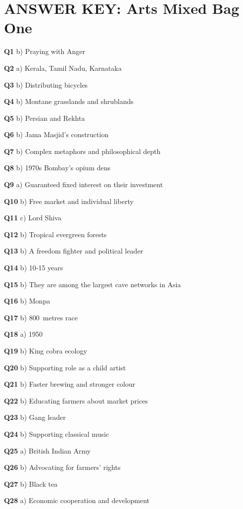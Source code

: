 \section{ANSWER KEY: Arts Mixed Bag One}

\textbf{Q1} b) Praying with Anger\par
\textbf{Q2} a) Kerala, Tamil Nadu, Karnataka\par
\textbf{Q3} b) Distributing bicycles\par
\textbf{Q4} b) Montane grasslands and shrublands\par
\textbf{Q5} b) Persian and Rekhta\par
\textbf{Q6} b) Jama Masjid's construction\par
\textbf{Q7} b) Complex metaphors and philosophical depth\par
\textbf{Q8} b) 1970s Bombay's opium dens\par
\textbf{Q9} a) Guaranteed fixed interest on their investment\par
\textbf{Q10} b) Free market and individual liberty\par
\textbf{Q11} c) Lord Shiva\par
\textbf{Q12} b) Tropical evergreen forests\par
\textbf{Q13} b) A freedom fighter and political leader\par
\textbf{Q14} b) 10‑15 years\par
\textbf{Q15} b) They are among the largest cave networks in Asia\par
\textbf{Q16} b) Monpa\par
\textbf{Q17} b) 800 metres race\par
\textbf{Q18} a) 1950\par
\textbf{Q19} b) King cobra ecology\par
\textbf{Q20} b) Supporting role as a child artist\par
\textbf{Q21} b) Faster brewing and stronger colour\par
\textbf{Q22} b) Educating farmers about market prices\par
\textbf{Q23} b) Gang leader\par
\textbf{Q24} b) Supporting classical music\par
\textbf{Q25} a) British Indian Army\par
\textbf{Q26} b) Advocating for farmers' rights\par
\textbf{Q27} b) Black tea\par
\textbf{Q28} a) Economic cooperation and development\par
